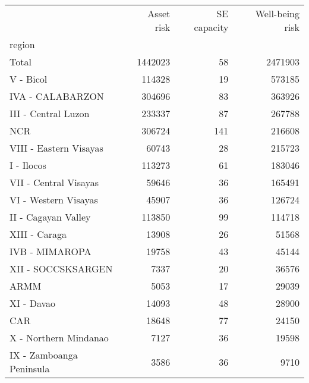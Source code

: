 \begin{tabular}{lrrr}
\toprule
{} &  Asset risk &  SE capacity &  Well-being risk \\
region                   &             &              &                  \\
\midrule
Total                    &     1442023 &           58 &          2471903 \\
V - Bicol                &      114328 &           19 &           573185 \\
IVA - CALABARZON         &      304696 &           83 &           363926 \\
III - Central Luzon      &      233337 &           87 &           267788 \\
NCR                      &      306724 &          141 &           216608 \\
VIII - Eastern Visayas   &       60743 &           28 &           215723 \\
I - Ilocos               &      113273 &           61 &           183046 \\
VII - Central Visayas    &       59646 &           36 &           165491 \\
VI - Western Visayas     &       45907 &           36 &           126724 \\
II - Cagayan Valley      &      113850 &           99 &           114718 \\
XIII - Caraga            &       13908 &           26 &            51568 \\
IVB - MIMAROPA           &       19758 &           43 &            45144 \\
XII - SOCCSKSARGEN       &        7337 &           20 &            36576 \\
ARMM                     &        5053 &           17 &            29039 \\
XI - Davao               &       14093 &           48 &            28900 \\
CAR                      &       18648 &           77 &            24150 \\
X - Northern Mindanao    &        7127 &           36 &            19598 \\
IX - Zamboanga Peninsula &        3586 &           36 &             9710 \\
\bottomrule
\end{tabular}

